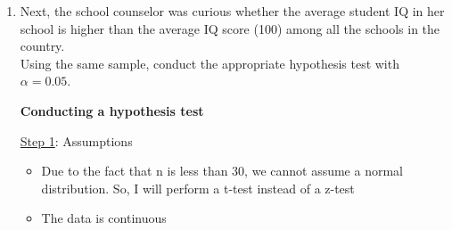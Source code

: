 \documentclass[12pt,letterpaper]{article}
\begin{document}
\begin{enumerate}
  

\begin{verbatim}
[1] -1.710882
\end{verbatim}

\noindent \underline{Step 6}: Calculate the lower limit of the confidence interval by calculating the sample mean - (the absolute value of the t-score * standard error)



\begin{verbatim}
[1] 93.95993
\end{verbatim}

\noindent \underline{Step 7}: Calculate the upper limit of the confidence interval by calculating the sample mean + (the absolute value of the t-score * standard error)



\begin{verbatim}
[1] 102.9201
\end{verbatim}

\noindent \textbf{Conclusion}: Based on the confidence interval, we are 90 percent confident that the true mean of IQ at the school is between 93.95993 and 102.9201.

\newpage

\item Next, the school counselor was curious  whether  the average student IQ in her school is higher than the average IQ score (100) among all the schools in the country.\\ 
	
\noindent Using the same sample, conduct the appropriate hypothesis test with $\alpha=0.05$.

\vspace{.5cm}

\textbf{Conducting a hypothesis test}

\noindent \underline{Step 1}: Assumptions

	\begin{itemize}
	\item Due to the fact that n is less than 30, we cannot assume a normal distribution. So, I will perform a t-test instead of a z-test
	
	\item The data is continuous
	

\end{itemize}
\end{enumerate}
\end{document}
